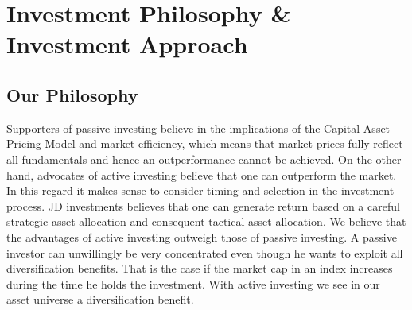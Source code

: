 \documentclass[11pt, DIV=15]{scrreprt}
\begin{document}


\chapter{Investment Philosophy \& Investment Approach}
\section*{Our Philosophy}
Supporters of passive investing believe in the implications of the Capital Asset Pricing Model and market efficiency, which means that market prices fully reflect all fundamentals and hence an outperformance cannot be achieved.
On the other hand, advocates of active investing believe that one can outperform the market.
In this regard it makes sense to consider timing and selection in the investment process.
JD investments believes that one can generate return based on a careful strategic asset allocation and consequent tactical asset allocation.
We believe that the advantages of active investing outweigh those of passive investing.
A passive investor can unwillingly be very concentrated even though he wants to exploit all diversification benefits.
That is the case if the market cap in an index increases during the time he holds the investment.
With active investing we see in our asset universe a diversification benefit.
\end{document}
